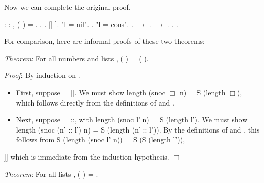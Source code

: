 \documentclass[12pt]{report}
\begin{document}
 Now we can complete the original proof. \begin{coqdoccode}
\coqdocemptyline
\coqdocnoindent
{}  : \coqdockw{\ensuremath{\forall}}  : ,\coqdoceol
\coqdocindent{1.00em}
 ( ) =  .\coqdoceol
\coqdocnoindent
{}.\coqdoceol
\coqdocindent{1.00em}
 .    [|  ].\coqdoceol
\coqdocindent{1.00em}
 "l = nil".\coqdoceol
\coqdocindent{2.00em}
.\coqdoceol
\coqdocindent{1.00em}
 "l = cons".\coqdoceol
\coqdocindent{2.00em}
.  \ensuremath{\rightarrow} .\coqdoceol
\coqdocindent{2.00em}
 \ensuremath{\rightarrow} . . .\coqdoceol
\coqdocemptyline
\end{coqdoccode}
For comparison, here are informal proofs of these two theorems: 


    \textit{Theorem}: For all numbers  and lists ,
        (  ) =  ( ).


    \textit{Proof}: By induction on .



\begin{itemize}
\item  First, suppose  = [].  We must show
        length (snoc \ensuremath{\Box} n) = S (length \ensuremath{\Box}),
      which follows directly from the definitions of
       and .



\item  Next, suppose  = ::, with
        length (snoc l' n) = S (length l').
      We must show
        length (snoc (n' :: l') n) = S (length (n' :: l')).
      By the definitions of  and , this
      follows from
        S (length (snoc l' n)) = S (S (length l')),

\end{itemize}
]] 
      which is immediate from the induction hypothesis. \ensuremath{\Box} 

 \textit{Theorem}: For all lists ,  ( ) =  .
\end{document}
